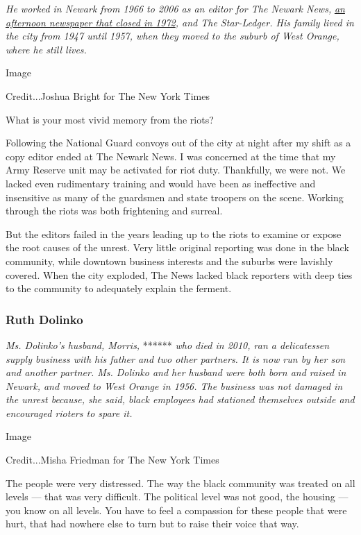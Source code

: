 \emph{He worked in Newark from 1966 to 2006 as an editor for The Newark
News,}
\href{http://www.nytimes3xbfgragh.onion/1981/08/30/nyregion/the-newark-news-in-memoriam.html}{\emph{an
afternoon newspaper that closed in 1972}}\emph{, and The Star-Ledger.
His family lived in the city from 1947 until 1957, when they moved to
the suburb of West Orange, where he still lives.}

Image

Credit...Joshua Bright for The New York Times

What is your most vivid memory from the riots?

Following the National Guard convoys out of the city at night after my
shift as a copy editor ended at The Newark News. I was concerned at the
time that my Army Reserve unit may be activated for riot duty.
Thankfully, we were not. We lacked even rudimentary training and would
have been as ineffective and insensitive as many of the guardsmen and
state troopers on the scene. Working through the riots was both
frightening and surreal.

But the editors failed in the years leading up to the riots to examine
or expose the root causes of the unrest. Very little original reporting
was done in the black community, while downtown business interests and
the suburbs were lavishly covered. When the city exploded, The News
lacked black reporters with deep ties to the community to adequately
explain the ferment.

\hypertarget{ruth-dolinko}{%
\subsubsection{Ruth Dolinko}\label{ruth-dolinko}}

\emph{Ms. Dolinko's husband, Morris,} ****** \emph{who died in 2010, ran
a delicatessen supply business with his father and two other partners.
It is now run by her son and another partner. Ms. Dolinko and her
husband were both born and raised in Newark, and moved to West Orange in
1956. The business was not damaged in the unrest because, she said,
black employees had stationed themselves outside and encouraged rioters
to spare it.}

Image

Credit...Misha Friedman for The New York Times

The people were very distressed. The way the black community was treated
on all levels --- that was very difficult. The political level was not
good, the housing --- you know on all levels. You have to feel a
compassion for these people that were hurt, that had nowhere else to
turn but to raise their voice that way.


